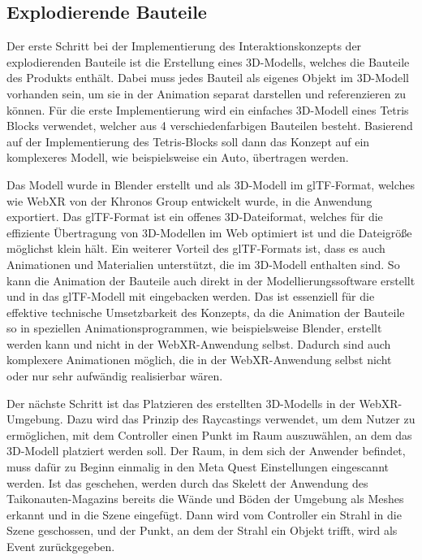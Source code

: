 \subsection{Explodierende Bauteile}

Der erste Schritt bei der Implementierung des Interaktionskonzepts der \glqq{}explodierenden\grqq{} Bauteile ist die Erstellung eines 3D-Modells, welches die Bauteile des Produkts enthält.
Dabei muss jedes Bauteil als eigenes Objekt im 3D-Modell vorhanden sein, um sie in der Animation separat darstellen und referenzieren zu können.
Für die erste Implementierung wird ein einfaches 3D-Modell eines Tetris Blocks verwendet, welcher aus 4 verschiedenfarbigen Bauteilen besteht.
Basierend auf der Implementierung des Tetris-Blocks soll dann das Konzept auf ein komplexeres Modell, wie beispielsweise ein Auto, übertragen werden.

Das Modell wurde in Blender erstellt und als 3D-Modell im glTF-Format, welches wie WebXR von der Khronos Group entwickelt wurde, in die Anwendung exportiert.
Das glTF-Format ist ein offenes 3D-Dateiformat, welches für die effiziente Übertragung von 3D-Modellen im Web optimiert ist und die Dateigröße möglichst klein hält.
Ein weiterer Vorteil des glTF-Formats ist, dass es auch Animationen und Materialien unterstützt, die im 3D-Modell enthalten sind.
So kann die Animation der Bauteile auch direkt in der Modellierungssoftware erstellt und in das glTF-Modell mit eingebacken werden.
Das ist essenziell für die effektive technische Umsetzbarkeit des Konzepts, da die Animation der Bauteile so in speziellen Animationsprogrammen, wie beispielsweise Blender, erstellt werden kann und nicht in der WebXR-Anwendung selbst.
Dadurch sind auch komplexere Animationen möglich, die in der WebXR-Anwendung selbst nicht oder nur sehr aufwändig realisierbar wären.

Der nächste Schritt ist das Platzieren des erstellten 3D-Modells in der WebXR-Umgebung.
Dazu wird das Prinzip des Raycastings verwendet, um dem Nutzer zu ermöglichen, mit dem Controller einen Punkt im Raum auszuwählen, an dem das 3D-Modell platziert werden soll.
Der Raum, in dem sich der Anwender befindet, muss dafür zu Beginn einmalig in den Meta Quest Einstellungen eingescannt werden.
Ist das geschehen, werden durch das Skelett der Anwendung des Taikonauten-Magazins bereits die Wände und Böden der Umgebung als Meshes erkannt und in die Szene eingefügt.
Dann wird vom Controller ein Strahl in die Szene geschossen, und der Punkt, an dem der Strahl ein Objekt trifft, wird als Event zurückgegeben.

